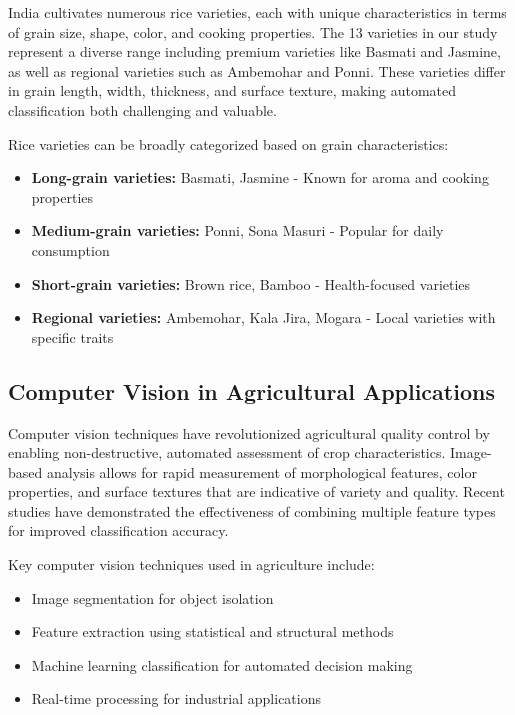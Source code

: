 \documentclass[conference]{IEEEtran}
\begin{document}
India cultivates numerous rice varieties, each with unique characteristics in terms of grain size, shape, color, and cooking properties. The 13 varieties in our study represent a diverse range including premium varieties like Basmati and Jasmine, as well as regional varieties such as Ambemohar and Ponni. These varieties differ in grain length, width, thickness, and surface texture, making automated classification both challenging and valuable.

Rice varieties can be broadly categorized based on grain characteristics:
\begin{itemize}
    \item \textbf{Long-grain varieties:} Basmati, Jasmine - Known for aroma and cooking properties
    \item \textbf{Medium-grain varieties:} Ponni, Sona Masuri - Popular for daily consumption
    \item \textbf{Short-grain varieties:} Brown rice, Bamboo - Health-focused varieties
    \item \textbf{Regional varieties:} Ambemohar, Kala Jira, Mogara - Local varieties with specific traits
\end{itemize}

\subsection{Computer Vision in Agricultural Applications}

Computer vision techniques have revolutionized agricultural quality control by enabling non-destructive, automated assessment of crop characteristics. Image-based analysis allows for rapid measurement of morphological features, color properties, and surface textures that are indicative of variety and quality. Recent studies have demonstrated the effectiveness of combining multiple feature types for improved classification accuracy.

Key computer vision techniques used in agriculture include:
\begin{itemize}
    \item Image segmentation for object isolation
    \item Feature extraction using statistical and structural methods
    \item Machine learning classification for automated decision making
    \item Real-time processing for industrial applications
\end{itemize}
\end{document}
